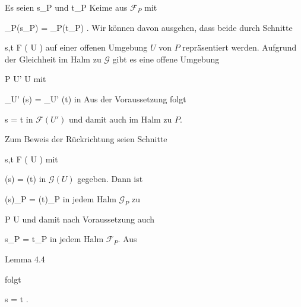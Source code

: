 {





Es seien
\mathkor {} {s_P} {und} {t_P} {}
Keime aus ${ \mathcal  F   }_P$ mit

\mavergleichskette
{\vergleichskette
{ \varphi_P(s_P)
}
{ = }{ \varphi_P(t_P)
}
{  }{
}
{    }{
}
{   }{
}
}
{}{}{.}
Wir können davon ausgehen, dass beide durch Schnitte

\mavergleichskette
{\vergleichskette
{ s,t
}
{ \in }{ { \mathcal  F   }  \left(   U   \right)
}
{  }{
}
{    }{
}
{   }{
}
}
{}{}{}
auf einer offenen Umgebung $U$ von $P$ repräsentiert werden. Aufgrund der Gleichheit im Halm zu ${ \mathcal  G   }$ gibt es eine offene Umgebung

\mavergleichskette
{\vergleichskette
{ P
}
{ \in }{ U'
}
{ \subseteq }{ U
}
{    }{
}
{   }{
}
}
{}{}{}
mit

\mavergleichskette
{\vergleichskette
{ \varphi_{U'} (s)
}
{ = }{ \varphi_{U'} (t)
}
{  }{
}
{    }{
}
{   }{
}
}
{}{}{}
in
 Aus der Voraussetzung folgt

\mavergleichskette
{\vergleichskette
{ s
}
{ = }{ t
}
{  }{
}
{    }{
}
{   }{
}
}
{}{}{}
in ${ \mathcal  F   }  \left(   U'   \right)$ und damit auch im Halm zu $P$.

Zum Beweis der Rückrichtung seien Schnitte

\mavergleichskette
{\vergleichskette
{s,t
}
{ \in }{ { \mathcal  F   }  \left(   U   \right)
}
{  }{
}
{    }{
}
{   }{
}
}
{}{}{}
mit

\mavergleichskette
{\vergleichskette
{ \varphi(s)
}
{ = }{ \varphi(t)
}
{  }{
}
{    }{
}
{   }{
}
}
{}{}{}
in ${ \mathcal  G   }  \left(   U   \right)$ gegeben. Dann ist

\mavergleichskette
{\vergleichskette
{ \varphi(s)_P
}
{ = }{ \varphi(t)_P
}
{  }{
}
{    }{
}
{   }{
}
}
{}{}{}
in jedem Halm ${ \mathcal  G   }_P$ zu

\mavergleichskette
{\vergleichskette
{ P
}
{ \in }{ U
}
{  }{
}
{    }{
}
{   }{
}
}
{}{}{}
und damit nach Voraussetzung
 {} {}
auch

\mavergleichskette
{\vergleichskette
{ s_P
}
{ = }{ t_P
}
{  }{
}
{    }{
}
{   }{
}
}
{}{}{}
in jedem Halm ${ \mathcal  F   }_P$. Aus

Lemma 4.4

folgt

\mavergleichskette
{\vergleichskette
{s
}
{ = }{t
}
{  }{
}
{    }{
}
{   }{
}
}
{}{}{.}




}






